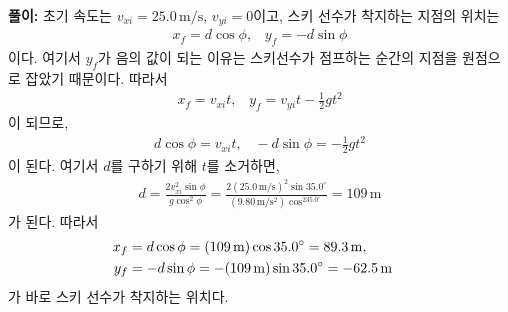 \documentclass[floatfix,nofootinbib,superscriptaddress,fleqn,preprint]{revtex4-2}
\begin{document}
\noindent \textbf{풀이:}
초기 속도는 $v_{xi}=25.0\,\mathrm{m/s}$,
$v_{yi}=0$이고, 스키 선수가 착지하는 지점의 위치는 
\begin{align}
  \label{eq:14}
  x_f = d\cos\phi,\;\;\; y_f = -d\sin\phi
\end{align}
이다. 여기서 $y_f$가 음의 값이 되는 이유는 스키선수가 점프하는 순간의
지점을 원점으로 잡았기 때문이다.
따라서 
\begin{align}
  \label{eq:15}
x_f = v_{xi} t,\;\;\; y_f = v_{yi} t - \frac12 gt^2  
\end{align}
이 되므로,
\begin{align}
  \label{eq:16}
  d\cos\phi = v_{xi} t,\;\;\;
  -d\sin\phi = -\frac12 g t^2
\end{align}
이 된다. 여기서 $d$를 구하기 위해 $t$를 소거하면,
\begin{align}
  \label{eq:17}
d = \frac{2v_{xi}^2 \sin\phi}{g\cos^2\phi} =
  \frac{2(25.0\,\mathrm{m/s})^2 \sin
  35.0^\circ}{(9.80\,\mathrm{m/s^2})\cos^235.0^\circ } =
  109\,\mathrm{m}   
\end{align}
가 된다. 따라서
\begin{align}
  \label{eq:18}
x_f &= d\cos\phi = (109\,\mathrm{m})\cos35.0^\circ = 89.3\,\mathrm{m},
      \cr
y_f &= -d\sin\phi = -(109\,\mathrm{m})\sin35.0^\circ =
      -62.5\,\mathrm{m}
\end{align}
가 바로 스키 선수가 착지하는 위치다. 


\vspace{1cm}
\end{document}
